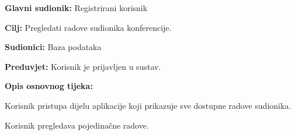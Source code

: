 					\noindent {}
					\begin{packed_item}
						
						\item \textbf{Glavni sudionik: }Registrirani korisnik
						\item  \textbf{Cilj:} Pregledati radove sudionika konferencije.
						\item  \textbf{Sudionici:} Baza podataka
						\item  \textbf{Preduvjet:} Korisnik je prijavljen u sustav.
						\item  \textbf{Opis osnovnog tijeka:}
						
						\item[] \begin{packed_enum}
							
							\item Korisnik pristupa dijelu aplikacije koji prikazuje sve dostupne radove sudionika.
							\item Korisnik pregledava pojedinačne radove.

						\end{packed_enum}
							
					\end{packed_item}

